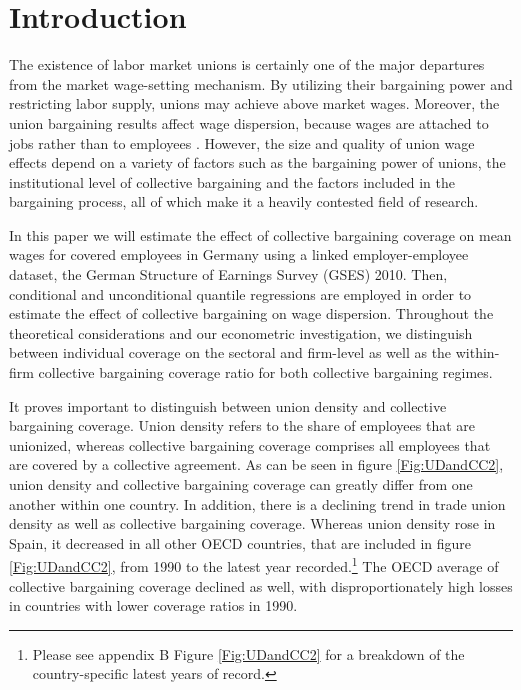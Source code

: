 \section{Introduction}
The existence of labor market unions is certainly one of the major departures from the market wage-setting mechanism. By utilizing their bargaining power and restricting labor supply, unions may achieve above market wages. Moreover, the union bargaining results affect wage dispersion, because wages are attached to jobs rather than to employees \citep{Bryson:14}. However, the size and quality of union wage effects depend on a variety of factors such as the bargaining power of unions, the institutional level of collective bargaining and the factors included in the bargaining process, all of which make it a heavily contested field of research.

In this paper we will estimate the effect of collective bargaining coverage on mean wages for covered employees in Germany using a linked employer-employee dataset, the German Structure of Earnings Survey (GSES) 2010. Then, conditional and unconditional quantile regressions are employed in order to estimate the effect of collective bargaining on wage dispersion. Throughout the theoretical considerations and our econometric investigation, we distinguish between individual coverage on the sectoral and firm-level as well as the within-firm collective bargaining coverage ratio for both collective bargaining regimes.

It proves important to distinguish between union density and collective bargaining coverage. Union density refers to the share of employees that are unionized, whereas collective bargaining coverage comprises all employees that are covered by a collective agreement. As can be seen in figure \ref{Fig:UDandCC2}, union density and collective bargaining coverage can greatly differ from one another within one country. In addition, there is a declining trend in trade union density as well as collective bargaining coverage. Whereas union density rose in Spain, it decreased in all other OECD countries, that are included in figure \ref{Fig:UDandCC2}, from 1990 to the latest year recorded.\footnote{Please see appendix B Figure \ref{Fig:UDandCC2} for a breakdown of the country-specific latest years of record.} The OECD average of collective bargaining coverage declined as well, with disproportionately high losses in countries with lower coverage ratios in 1990.

